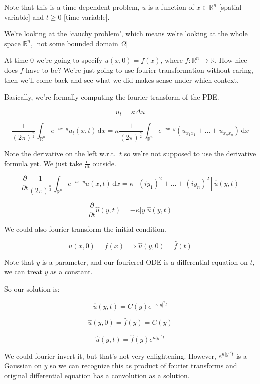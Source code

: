 \documentclass{article}
\theoremstyle{definition}
\begin{document}
Note that this is a time dependent problem, \(u\) is a function of \(x\in \mathbb{R} ^n\) [spatial variable] and \(t \geq 0\) [time variable].

We're looking at the `cauchy problem', which means we're looking at the whole space \(\mathbb{R}^n\), [not some bounded domain \(\Omega\)]

At time \(0\) we're going to specify \(u(x,0)=f(x)\), where \(f : \mathbb{R} ^n \to \mathbb{R}\). How nice does \(f\) have to be? We're just going to use fourier transformation without caring, then we'll come back and see what we did makes sense under which context.

Basically, we're formally computing the fourier transform of the PDE.

\[
    u_t = \kappa \Delta u
\]

\[
    \frac{1}{(2\pi)^{\frac{n}{2}}}\int_{\mathbb{R} ^n}^{} e^{-i x\cdot y} u_t(x,t) \,\mathrm{d}x = \kappa \frac{1}{(2\pi)^{\frac{n}{2}}}\int_{\mathbb{R}^n}^{} e^{-ix\cdot y} (u_{x_1 x_1} + \dots + u_{x_n x_n}) \,\mathrm{d}x 
\]

Note the derivative on the left w.r.t.\ \(t\) so we're not supposed to use the derivative formula yet. We just take \(\frac{\mathrm{d}}{\mathrm{d}t} \) outside.

\[
    \frac{\partial }{\partial t} \frac{1}{(2\pi)^{\frac{n}{2}}}\int_{\mathbb{R}^n}^{} e^{-ix\cdot y}u(x,t) \,\mathrm{d}x = \kappa \left[ (iy_1)^2 + \dots +(iy_n)^2 \right] \widehat u(y,t)
\]

\[
    \frac{\partial}{\partial t} \widehat u(y,t) = - \kappa \vert y \vert \widehat u(y,t)
\]

We could also fourier transform the initial condition.

\[
    u(x,0)=f(x) \implies \widehat u(y,0) = \widehat f(t)
\]

Note that \(y\) is a parameter, and our fouriered ODE is a differential equation on \(t\), we can treat \(y\) as a constant.

So our solution is:

\[
    \widehat{u}(y,t) = C(y) e^{-\kappa \vert y \vert ^2 t} 
\]

\[
    \widehat{u}(y,0) = \widehat f(y) = C(y)
\]

\[
    \boxed{ \widehat u(y,t) = \widehat f(y) e^{\kappa \vert y \vert ^2 t} }
\]

We could fourier invert it, but that's not very enlightening. However, \(e^{\kappa \vert y \vert ^2 t}\) is a Gaussian on \(y\) so we can recognize this as product of fourier transforms and original differential equation has a convolution as a solution.
\end{document}
